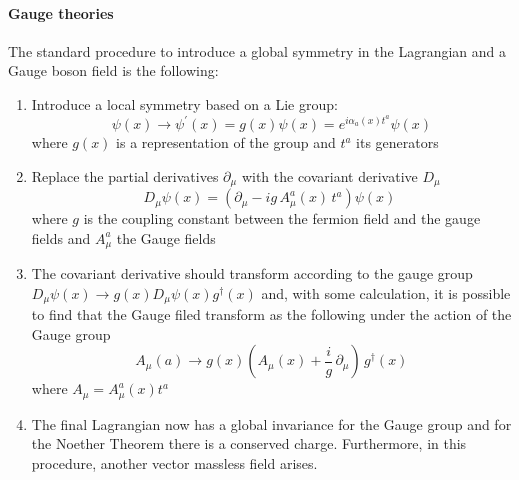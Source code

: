 \paragraph*{Gauge theories}
The standard procedure to introduce a global symmetry in the Lagrangian and a Gauge boson field is the following:
\begin{enumerate}
    \item Introduce a local symmetry based on a Lie group:
    \begin{equation}\label{eq:spinor_gauge}
        \psi(x) \to \psi^\prime (x)=g(x) \psi(x) = e^{i \alpha_a(x) t^a}\psi(x)
    \end{equation}
    where $g(x)$ is a representation of the group and $t^a$ its generators
    \item Replace the partial derivatives $\partial_\mu$ with the covariant derivative $D_\mu$
    \begin{equation}\label{eq:covariant_derivative}
        D_{\mu}\psi(x)=\left(\partial_{\mu}-i g\,A_{\mu}^{a}(x)\,t^{a}\right)\psi(x)\;
    \end{equation}
    where $g$ is the coupling constant between the fermion field and the gauge fields and $A^a_\mu$ the Gauge fields 
    \item The covariant derivative should transform according to the gauge group $D_\mu \psi(x)\to g(x) D_\mu \psi(x)g^\dagger (x)$ and, with some calculation, it is possible to find that the Gauge filed transform as the following under the action of the Gauge group
    \begin{equation}\label{eq:gauge_field_transformation}
        A_{\mu}(a)\rightarrow g(x)\left(A_{\mu}(x)+\frac i g\,\partial_{\mu}\right)\,g^{\dagger}(x)
    \end{equation}
    where $A_\mu=A_\mu^a(x)t^a$
    \item The final Lagrangian now has a global invariance for the Gauge group and for the Noether Theorem there is a conserved charge. Furthermore, in this procedure, another vector massless field arises.
\end{enumerate}

